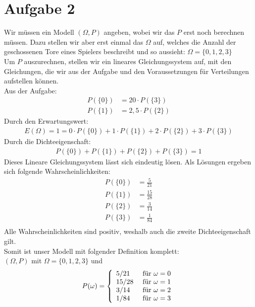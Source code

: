 \documentclass[10pt,a4paper]{article}
\begin{document}
\section*{Aufgabe 2}
Wir müssen ein Modell $(\Omega, P)$ angeben, wobei wir das $P$ erst noch berechnen müssen. Dazu stellen wir aber erst einmal das $\Omega$ auf, welches die Anzahl der geschossenen Tore eines Spielers beschreibt und so aussieht: $\Omega = \{0,1,2,3\}$\\
Um $P$ auszurechnen, stellen wir ein lineares Gleichungssystem auf, mit den Gleichungen, die wir aus der Aufgabe und den Voraussetzungen für Verteilungen aufstellen können.\\
Aus der Aufgabe:
\begin{eqnarray*}
P(\{0\}) &= 20 \cdot P(\{3\})\\
P(\{1\}) &= 2,5 \cdot P(\{2\})
\end{eqnarray*}
Durch den Erwartungswert:
\begin{eqnarray*}
E(\Omega) = 1 = 0 \cdot P(\{0\}) + 1 \cdot P(\{1\}) + 2 \cdot P(\{2\}) + 3 \cdot P(\{3\})
\end{eqnarray*}
Durch die Dichteeigenschaft:
\begin{eqnarray*}
P(\{0\}) + P(\{1\}) + P(\{2\}) + P(\{3\}) = 1
\end{eqnarray*}
Dieses Lineare Gleichungssystem lässt sich eindeutig lösen. Als Lösungen ergeben sich folgende Wahrscheinlichkeiten:
\begin{align*}
P(\{0\}) &= \frac{5}{21}\\
P(\{1\}) &= \frac{15}{28}\\
P(\{2\}) &= \frac{3}{14}\\
P(\{3\}) &= \frac{1}{84}\\
\end{align*}
Alle Wahrscheinlichkeiten sind positiv, weshalb auch die zweite Dichteeigenschaft gilt.\\
Somit ist unser Modell mit folgender Definition komplett:\\
$(\Omega, P)$ mit $\Omega = \{0,1,2,3\}$ und
\begin{align*}
P(\omega) = \left\{
	\begin{array}{l l}
		5/21 &\text{ für } \omega = 0\\
		15/28 &\text{ für } \omega = 1\\
		3/14 &\text{ für } \omega = 2\\
		1/84 &\text{ für } \omega = 3
	\end{array}
\right.
\end{align*}
\end{document}
